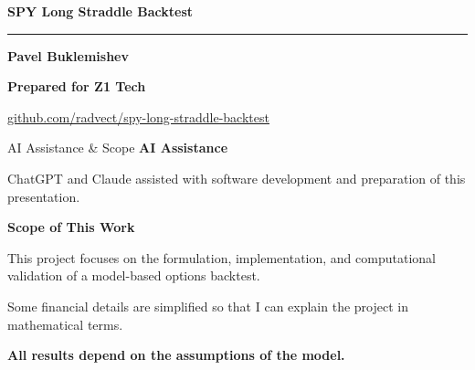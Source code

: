\documentclass[10pt,aspectratio=169]{beamer}
\begin{document}
\begin{frame}[plain]
\vspace{1.06cm}
{\fontsize{29}{33}\selectfont\bfseries\color{NavyBlue}SPY Long Straddle Backtest}\par
\vspace{0.28cm}
{\color{AccentBlue}\rule{2.15cm}{1.5pt}}\par
\vspace{0.44cm}
{\large\bfseries Pavel Buklemishev}\par
\vspace{0.09cm}

\vfill
{\normalsize\bfseries Prepared for Z1 Tech}\par
\vspace{0.16cm}
{\small\href{https://github.com/radvect/spy-long-straddle-backtest}{\color{AccentBlue}\underline{github.com/radvect/spy-long-straddle-backtest}}}\par
\vspace{0.34cm}
\end{frame}

\begin{frame}{AI Assistance \& Scope}
\vspace{0.30cm}
{\large\bfseries AI Assistance}\par
\vspace{0.20cm}
ChatGPT and Claude assisted with software development and preparation of this presentation.\par

\vspace{0.95cm}
{\large\bfseries Scope of This Work}\par
\vspace{0.20cm}
This project focuses on the formulation, implementation, and computational validation of a model-based options backtest.\par
\vspace{0.34cm}
Some financial details are simplified so that I can explain the project in mathematical terms.\par
\vfill
{\bfseries All results depend on the assumptions of the model.}\par
\vspace{0.18cm}
\end{frame}
\end{document}
